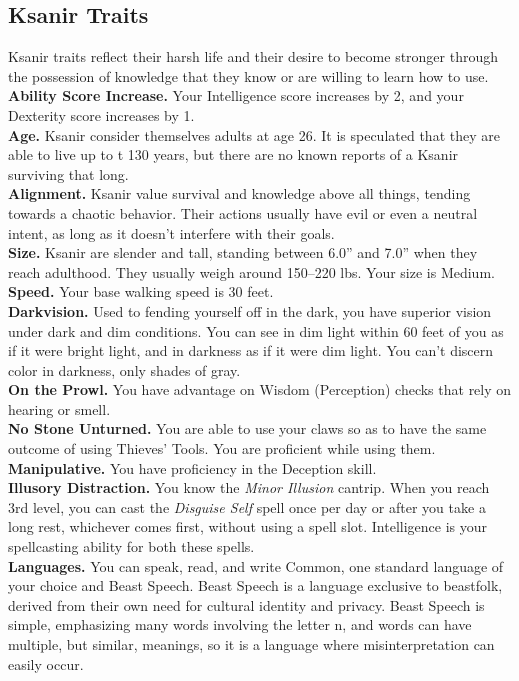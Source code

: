 \documentclass[10pt,twoside,twocolumn,openany]{book}
\begin{document}
\subsection{Ksanir Traits}
Ksanir traits reflect their harsh life and their desire to become stronger through the possession of knowledge that they know or are willing to learn how to use. \\
\indent \textbf{Ability Score Increase.} Your Intelligence score increases by 2, and your Dexterity score increases by 1.\\
\indent \textbf{Age.} Ksanir consider themselves adults at age 26. It is speculated that they are able to live up to t 130 years, but there are no known reports of a Ksanir surviving that long. \\
\indent \textbf{Alignment.} Ksanir value survival and knowledge above all things, tending towards a chaotic behavior. Their actions usually have evil or even a neutral intent, as long as it doesn't interfere with their goals.\\
\indent \textbf{Size.}  Ksanir are slender and tall, standing between 6.0” and 7.0” when they reach adulthood. They usually weigh around 150–220 lbs. Your size is Medium.\\
\indent \textbf{Speed.} Your base walking speed is 30 feet.\\
\indent \textbf{Darkvision.} Used to fending yourself off in the dark, you have superior vision under dark and dim conditions. You can see in dim light within 60 feet of you as if it were bright light, and in darkness as if it were dim light. You can’t discern color in darkness, only shades of gray. \\
\indent \textbf{On the Prowl.} You have advantage on Wisdom (Perception) checks that rely on hearing or smell.\\
\indent \textbf{No Stone Unturned.} You are able to use your claws so as to have the same outcome of using Thieves' Tools. You are proficient while using them.\\
\indent \textbf{Manipulative.} You have proficiency in the Deception skill.\\
\indent \textbf{Illusory Distraction.} You know the \textit{Minor Illusion} cantrip. When you reach 3rd level, you can cast the \textit{Disguise Self} spell once per day or after you take a long rest, whichever comes first, without using a spell slot. Intelligence is your spellcasting ability for both these spells.\\
\indent \textbf{Languages.} You can speak, read, and write Common, one standard language of your choice and Beast Speech. Beast Speech is a language exclusive to beastfolk, derived from their own need for cultural identity and privacy. Beast Speech is simple, emphasizing many words involving the letter n, and words can have multiple, but similar, meanings, so it is a language where misinterpretation can easily occur.\\
\end{document}
